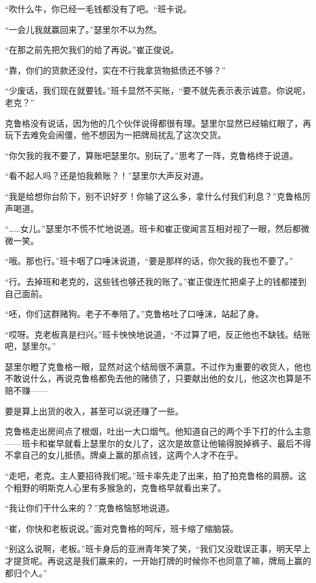 “吹什么牛，你已经一毛钱都没有了吧。“班卡说。

“一会儿我就赢回来了。”瑟里尔不以为然。

“在那之前先把欠我们的给了再说。”崔正俊说。

“靠，你们的货款还没付，实在不行我拿货物抵债还不够？”

“少废话，我们现在就要钱。”班卡显然不买账，“要不就先表示表示诚意。你说呢，老克？”

克鲁格没有说话，因为他的几个伙伴说得都很有理。瑟里尔显然已经输红眼了，再玩下去难免会闹僵，他不想因为一把牌局扰乱了这次交货。

“你欠我的我不要了，算账吧瑟里尔。别玩了。”思考了一阵，克鲁格终于说道。

“看不起人吗？还是怕我赖账？！”瑟里尔大声反对道。

“我是给想你台阶下，别不识好歹！你输了这么多，拿什么付我们利息？”克鲁格厉声喝道。

“……女儿。”瑟里尔不慌不忙地说道。班卡和崔正俊闻言互相对视了一眼，然后都微微一笑。

“哦。那也行。”班卡咽了口唾沫说道，“要是那样的话，你欠我的我也不要了。”

“行。去掉班和老克的，这些钱也够还我的账了。”崔正俊连忙把桌子上的钱都搂到自己面前。

“呸，你们这群赌狗。老子不奉陪了。”克鲁格吐了口唾沫，站起了身。

“哎呀。克老板真是扫兴。”班卡怏怏地说道，“不过算了吧，反正他也不缺钱。结账吧，瑟里尔。”

瑟里尔瞪了克鲁格一眼，显然对这个结局很不满意。不过作为重要的收货人，他也不敢说什么，再说克鲁格都免去他的赌债了，只要献出他的女儿，他这次也算是不赔不赚——

要是算上出货的收入，甚至可以说还赚了一些。

克鲁格走出房间点了根烟，吐出一大口烟气。他知道自己的两个手下打的什么主意——班卡和崔早就看上瑟里尔的女儿了，这次是故意让他输得脱掉裤子、最后不得不拿自己的女儿抵债。牌桌上赢的那点钱，这两个人才不在乎。

“走吧，老克。主人要招待我们呢。”班卡率先走了出来，拍了拍克鲁格的肩膀。这个粗野的明斯克人心里有多猴急的，克鲁格早就看出来了。

“我让你们干什么来的？”克鲁格恼怒地说道。

“崔，你快和老板说说。”面对克鲁格的呵斥，班卡缩了缩脑袋。

“别这么说啊，老板。”班卡身后的亚洲青年笑了笑，“我们又没耽误正事，明天早上才提货呢。再说这是我们赢来的，一开始打牌的时候你不也同意了嘛，牌局上赢的都归个人。”

